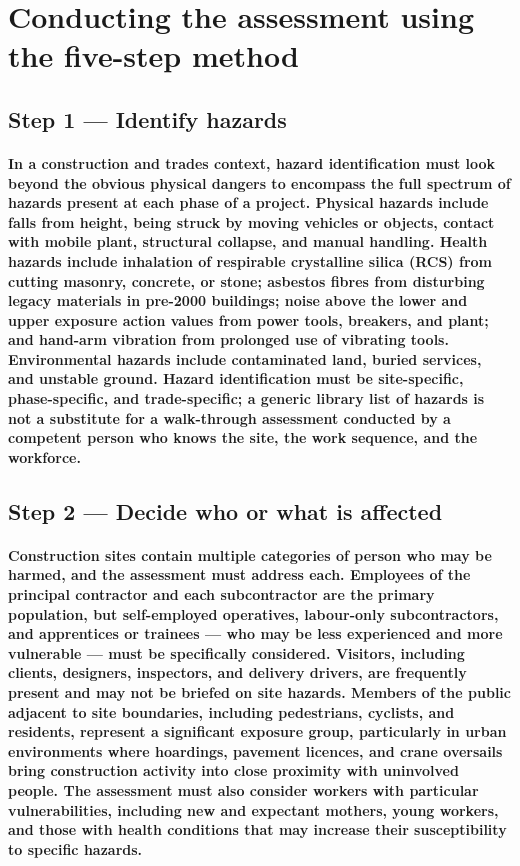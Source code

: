 \section{Conducting the assessment using the five-step method}

\subsection{Step 1 --- Identify hazards}
\paragraph{In a construction and trades context, hazard identification must look beyond the obvious physical dangers to encompass the full spectrum of hazards present at each phase of a project. Physical hazards include falls from height, being struck by moving vehicles or objects, contact with mobile plant, structural collapse, and manual handling. Health hazards include inhalation of respirable crystalline silica (RCS) from cutting masonry, concrete, or stone; asbestos fibres from disturbing legacy materials in pre-2000 buildings; noise above the lower and upper exposure action values from power tools, breakers, and plant; and hand-arm vibration from prolonged use of vibrating tools. Environmental hazards include contaminated land, buried services, and unstable ground. Hazard identification must be site-specific, phase-specific, and trade-specific; a generic library list of hazards is not a substitute for a walk-through assessment conducted by a competent person who knows the site, the work sequence, and the workforce.}

\subsection{Step 2 --- Decide who or what is affected}
\paragraph{Construction sites contain multiple categories of person who may be harmed, and the assessment must address each. Employees of the principal contractor and each subcontractor are the primary population, but self-employed operatives, labour-only subcontractors, and apprentices or trainees --- who may be less experienced and more vulnerable --- must be specifically considered. Visitors, including clients, designers, inspectors, and delivery drivers, are frequently present and may not be briefed on site hazards. Members of the public adjacent to site boundaries, including pedestrians, cyclists, and residents, represent a significant exposure group, particularly in urban environments where hoardings, pavement licences, and crane oversails bring construction activity into close proximity with uninvolved people. The assessment must also consider workers with particular vulnerabilities, including new and expectant mothers, young workers, and those with health conditions that may increase their susceptibility to specific hazards.}

